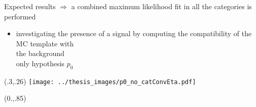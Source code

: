 \documentclass[10pt,UKenglish, leqno, xcolor = dvipsnames]{beamer}
\begin{document}
	\begin{frame}{Expected results}
		\vspace{.4cm}
		$\Longrightarrow$ a combined maximum likelihood fit in all the categories is performed
		\begin{itemize}
			\item investigating the presence of a signal by computing the compatibility of the MC template with\\ the background\\ only hypothesis $p_0$
		\end{itemize}	
		\begin{textblock}{1}(.3,.26)	
			\texttt{[image: ../thesis\_images/p0\_no\_catConvEta.pdf]}\\
		\end{textblock}
		\begin{textblock}{1}(0.,.85)
			\begin{figure}
			\end{figure}
		\end{textblock}
	\end{frame}
	
\end{document}
